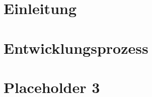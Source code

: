 









\tableofcontents
\newpage
\listoffigures
%


\chapter{Einleitung}


\chapter{Entwicklungsprozess}


\chapter{Placeholder 3}



\renewcommand{\bibname}{References}



